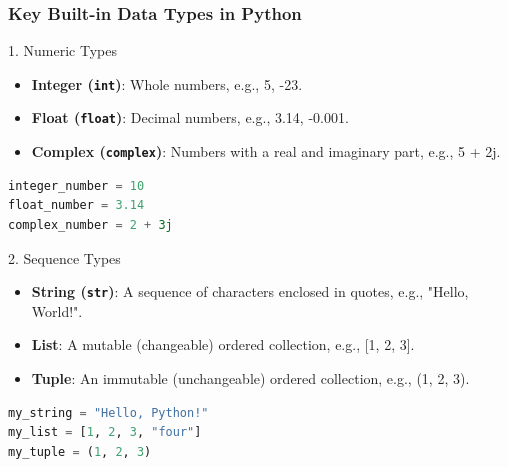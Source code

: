 \documentclass{beamer}
\begin{document}
\begin{frame}[fragile]
    \frametitle{Key Built-in Data Types in Python}
    
    \begin{block}{1. Numeric Types}
        \begin{itemize}
            \item \textbf{Integer (\texttt{int})}: Whole numbers, e.g., 5, -23.
            \item \textbf{Float (\texttt{float})}: Decimal numbers, e.g., 3.14, -0.001.
            \item \textbf{Complex (\texttt{complex})}: Numbers with a real and imaginary part, e.g., 5 + 2j.
        \end{itemize}
        \begin{lstlisting}[language=Python]
integer_number = 10
float_number = 3.14
complex_number = 2 + 3j
        \end{lstlisting}
    \end{block}
    
    \begin{block}{2. Sequence Types}
        \begin{itemize}
            \item \textbf{String (\texttt{str})}: A sequence of characters enclosed in quotes, e.g., "Hello, World!".
            \item \textbf{List}: A mutable (changeable) ordered collection, e.g., [1, 2, 3].
            \item \textbf{Tuple}: An immutable (unchangeable) ordered collection, e.g., (1, 2, 3).
        \end{itemize}
        \begin{lstlisting}[language=Python]
my_string = "Hello, Python!"
my_list = [1, 2, 3, "four"]
my_tuple = (1, 2, 3)
        \end{lstlisting}
    \end{block}
\end{frame}
\end{document}
